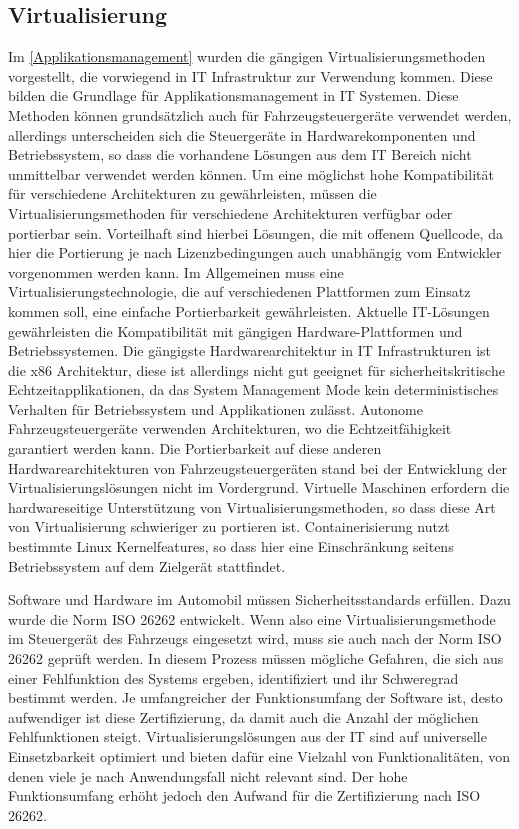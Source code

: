 \subsection{Virtualisierung}
\label{Virtualisierung}
Im \autoref{Applikationsmanagement} wurden die gängigen Virtualisierungsmethoden vorgestellt, die vorwiegend in IT Infrastruktur zur Verwendung kommen. Diese bilden die Grundlage für Applikationsmanagement in IT Systemen. Diese Methoden können grundsätzlich auch für Fahrzeugsteuergeräte verwendet werden, allerdings unterscheiden sich die Steuergeräte in Hardwarekomponenten und Betriebssystem, so dass die vorhandene Lösungen aus dem IT Bereich nicht unmittelbar verwendet werden können. Um eine möglichst hohe Kompatibilität für verschiedene Architekturen zu gewährleisten, müssen die Virtualisierungsmethoden für verschiedene Architekturen verfügbar oder portierbar sein. Vorteilhaft sind hierbei Lösungen, die mit offenem Quellcode, da hier die Portierung je nach Lizenzbedingungen auch unabhängig vom Entwickler vorgenommen werden kann. Im Allgemeinen muss eine Virtualisierungstechnologie, die auf verschiedenen Plattformen zum Einsatz kommen soll, eine einfache Portierbarkeit gewährleisten. Aktuelle IT-Lösungen gewährleisten die Kompatibilität mit gängigen Hardware-Plattformen und Betriebssystemen. Die gängigste Hardwarearchitektur in IT Infrastrukturen ist die x86 Architektur, diese ist allerdings nicht gut geeignet für sicherheitskritische Echtzeitapplikationen, da das System Management Mode kein deterministisches Verhalten für Betriebssystem und Applikationen zulässt. Autonome Fahrzeugsteuergeräte verwenden Architekturen, wo die Echtzeitfähigkeit garantiert werden kann. Die Portierbarkeit auf diese anderen Hardwarearchitekturen von Fahrzeugsteuergeräten stand bei der Entwicklung der Virtualisierungslösungen nicht im Vordergrund. Virtuelle Maschinen erfordern die hardwareseitige Unterstützung von Virtualisierungsmethoden, so dass diese Art von Virtualisierung schwieriger zu portieren ist. Containerisierung nutzt bestimmte Linux Kernelfeatures, so dass hier eine Einschränkung seitens Betriebssystem auf dem Zielgerät stattfindet. 

Software und Hardware im Automobil müssen Sicherheitsstandards erfüllen. Dazu wurde die Norm ISO 26262 entwickelt. \cite{Birch2013} Wenn also eine Virtualisierungsmethode im Steuergerät des Fahrzeugs eingesetzt wird, muss sie auch nach der Norm ISO 26262 geprüft werden. In diesem Prozess müssen mögliche Gefahren, die sich aus einer Fehlfunktion des Systems ergeben, identifiziert und ihr Schweregrad bestimmt werden. Je umfangreicher der Funktionsumfang der Software ist, desto aufwendiger ist diese Zertifizierung, da damit auch die Anzahl der möglichen Fehlfunktionen steigt. Virtualisierungslösungen aus der IT sind auf universelle Einsetzbarkeit optimiert und bieten dafür eine Vielzahl von Funktionalitäten, von denen viele je nach Anwendungsfall nicht relevant sind. Der hohe Funktionsumfang erhöht jedoch den Aufwand für die Zertifizierung nach ISO 26262.

